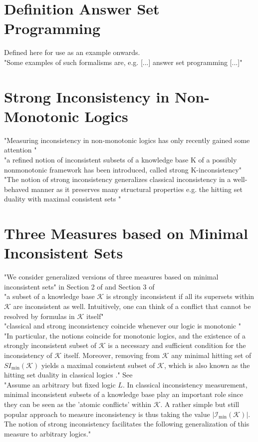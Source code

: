 \section{Definition Answer Set Programming}
Defined here for use as an example onwards.
\\
"Some examples of such formalisms are, e.g. [...] answer set programming \cite{gelfond_logic_2002} [...]"

\section{Strong Inconsistency in Non-Monotonic Logics}

"Measuring inconsistency in non-monotonic logics has only recently gained some attention \cite{michael_measuring_2016} \cite{brewka_strong_2017} \cite{ulbricht_measuring_2018} \cite{brewka_strong_2019}"
\\
"a refined notion of inconsistent subsets of a knowledge base K of a possibly nonmonotonic framework has been introduced, called strong K-inconsistency"
\cite{brewka_strong_2017}
\\
"The notion of strong inconsistency generalizes classical inconsistency in a well-behaved manner as it preserves many structural properties e.g. the hitting set duality with maximal consistent sets \cite{reiter_theory_1987}"

\section{Three Measures based on Minimal Inconsistent Sets}
"We consider generalized versions of three measures based on minimal inconsistent sets" in Section 2 of \cite{ulbricht_measuring_2018} and Section 3 of \cite{ulbricht_handling_2020}
\\
"a subset of a knowledge base \(\mathcal{K}\) is strongly inconsistent if all its supersets within \(\mathcal{K}\) are inconsistent as well. Intuitively, one can think of a conflict that cannot be resolved by formulas in \(\mathcal{K}\) itself"
\\
"classical and strong inconsistency coincide whenever our logic is monotonic \cite{brewka_strong_2019}"
\\
"In particular, the notions coincide for monotonic logics, and the existence of a strongly inconsistent subset of \(\mathcal{K}\) is a necessary and sufficient condition for the inconsistency of \(\mathcal{K}\) itself. Moreover, removing from \(\mathcal{K}\) any minimal hitting set of \(SI_{\min}(\mathcal{K})\) yields a maximal consistent subset of \(\mathcal{K}\), which is also known as the hitting set duality in classical logics \cite{reiter_theory_1987}." See \cite{brewka_strong_2017}
\\
"Assume an arbitrary but fixed logic \(L\). In classical inconsistency measurement, minimal inconsistent subsets of a knowledge base play an important role since they can be seen as the 'atomic conflicts' within \(\mathcal{K}\). A rather simple but still popular approach to measure inconsistency is thus taking the value \(\left| \mathcal{I}_{\min}(\mathcal{K}) \right|\). The notion of strong inconsistency facilitates the following generalization of this measure to arbitrary logics."

